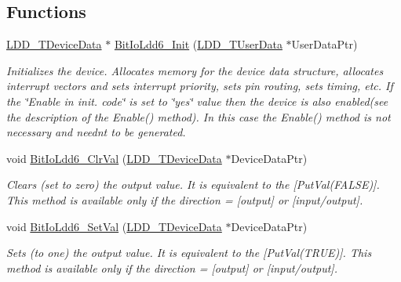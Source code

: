 \subsection*{Functions}
\begin{DoxyCompactItemize}
\item 
\hyperlink{group___p_e___types__module_gac5cf1362f1f0e3a2ce71b1bf2276d091}{L\+D\+D\+\_\+\+T\+Device\+Data} $\ast$ \hyperlink{group___bit_io_ldd6__module_gaff0c7e309720dbf2e46e7ce4f96b3035}{Bit\+Io\+Ldd6\+\_\+\+Init} (\hyperlink{group___p_e___types__module_ga0b66a73f87238a782318aa0be7578e35}{L\+D\+D\+\_\+\+T\+User\+Data} $\ast$User\+Data\+Ptr)
\begin{DoxyCompactList}\small\item\em Initializes the device. Allocates memory for the device data structure, allocates interrupt vectors and sets interrupt priority, sets pin routing, sets timing, etc. If the \char`\"{}\+Enable
    in init. code\char`\"{} is set to \char`\"{}yes\char`\"{} value then the device is also enabled(see the description of the Enable() method). In this case the Enable() method is not necessary and needn\textquotesingle{}t to be generated. \end{DoxyCompactList}\item 
void \hyperlink{group___bit_io_ldd6__module_gafd64ff152f22fe76fa77ffb453306285}{Bit\+Io\+Ldd6\+\_\+\+Clr\+Val} (\hyperlink{group___p_e___types__module_gac5cf1362f1f0e3a2ce71b1bf2276d091}{L\+D\+D\+\_\+\+T\+Device\+Data} $\ast$Device\+Data\+Ptr)
\begin{DoxyCompactList}\small\item\em Clears (set to zero) the output value. It is equivalent to the \mbox{[}Put\+Val(\+F\+A\+L\+S\+E)\mbox{]}. This method is available only if the direction = {\itshape \mbox{[}output\mbox{]}} or {\itshape \mbox{[}input/output\mbox{]}}. \end{DoxyCompactList}\item 
void \hyperlink{group___bit_io_ldd6__module_ga349b97d02eb4a3fd7be6930aa55d08cc}{Bit\+Io\+Ldd6\+\_\+\+Set\+Val} (\hyperlink{group___p_e___types__module_gac5cf1362f1f0e3a2ce71b1bf2276d091}{L\+D\+D\+\_\+\+T\+Device\+Data} $\ast$Device\+Data\+Ptr)
\begin{DoxyCompactList}\small\item\em Sets (to one) the output value. It is equivalent to the \mbox{[}Put\+Val(\+T\+R\+U\+E)\mbox{]}. This method is available only if the direction = {\itshape \mbox{[}output\mbox{]}} or {\itshape \mbox{[}input/output\mbox{]}}. \end{DoxyCompactList}\end{DoxyCompactItemize}


